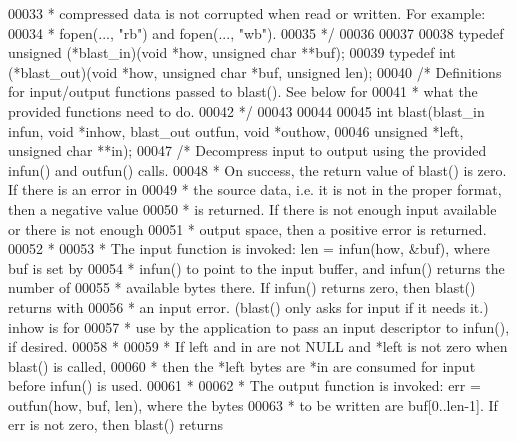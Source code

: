 \begin{DoxyCode}
00033 \textcolor{comment}{ * compressed data is not corrupted when read or written.  For example:}
00034 \textcolor{comment}{ * fopen(..., "rb") and fopen(..., "wb").}
00035 \textcolor{comment}{ */}
00036 
00037 
00038 \textcolor{keyword}{typedef} unsigned (*blast\_in)(\textcolor{keywordtype}{void} *how, \textcolor{keywordtype}{unsigned} \textcolor{keywordtype}{char} **buf);
00039 \textcolor{keyword}{typedef} int (*blast\_out)(\textcolor{keywordtype}{void} *how, \textcolor{keywordtype}{unsigned} \textcolor{keywordtype}{char} *buf, \textcolor{keywordtype}{unsigned} len);
00040 \textcolor{comment}{/* Definitions for input/output functions passed to blast().  See below for}
00041 \textcolor{comment}{ * what the provided functions need to do.}
00042 \textcolor{comment}{ */}
00043 
00044 
00045 \textcolor{keywordtype}{int} blast(blast\_in infun, \textcolor{keywordtype}{void} *inhow, blast\_out outfun, \textcolor{keywordtype}{void} *outhow,
00046           \textcolor{keywordtype}{unsigned} *left, \textcolor{keywordtype}{unsigned} \textcolor{keywordtype}{char} **in);
00047 \textcolor{comment}{/* Decompress input to output using the provided infun() and outfun() calls.}
00048 \textcolor{comment}{ * On success, the return value of blast() is zero.  If there is an error in}
00049 \textcolor{comment}{ * the source data, i.e. it is not in the proper format, then a negative value}
00050 \textcolor{comment}{ * is returned.  If there is not enough input available or there is not enough}
00051 \textcolor{comment}{ * output space, then a positive error is returned.}
00052 \textcolor{comment}{ *}
00053 \textcolor{comment}{ * The input function is invoked: len = infun(how, &buf), where buf is set by}
00054 \textcolor{comment}{ * infun() to point to the input buffer, and infun() returns the number of}
00055 \textcolor{comment}{ * available bytes there.  If infun() returns zero, then blast() returns with}
00056 \textcolor{comment}{ * an input error.  (blast() only asks for input if it needs it.)  inhow is for}
00057 \textcolor{comment}{ * use by the application to pass an input descriptor to infun(), if desired.}
00058 \textcolor{comment}{ *}
00059 \textcolor{comment}{ * If left and in are not NULL and *left is not zero when blast() is called,}
00060 \textcolor{comment}{ * then the *left bytes are *in are consumed for input before infun() is used.}
00061 \textcolor{comment}{ *}
00062 \textcolor{comment}{ * The output function is invoked: err = outfun(how, buf, len), where the bytes}
00063 \textcolor{comment}{ * to be written are buf[0..len-1].  If err is not zero, then blast() returns}

\end{DoxyCode}

